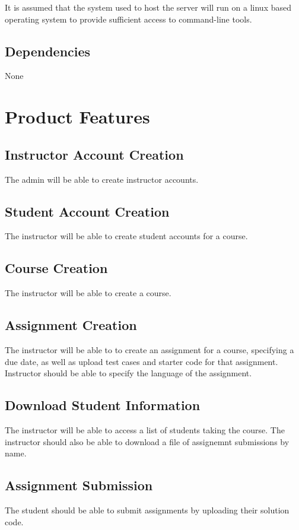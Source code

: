 \documentclass{article}
\begin{document}
It is assumed that the system used to host the server will run on a linux based operating system to provide sufficient access to command-line tools.

\subsection{Dependencies}
None

\section{Product Features}

\subsection{Instructor Account Creation}
The admin will be able to create instructor accounts.

\subsection{Student Account Creation}
The instructor will be able to create student accounts for a course.

\subsection{Course Creation}
The instructor will be able to create a course.

\subsection{Assignment Creation}
The instructor will be able to to create an assignment for a course, specifying a due date, as well as upload test cases and starter code for that assignment. Instructor should be able to specify the language of the assignment.

\subsection{Download Student Information}
The instructor will be able to access a list of students taking the course. The instructor should also be able to download a file of assignemnt submissions by name.

\subsection{Assignment Submission}
The student should be able to submit assignments by uploading their solution code.
\end{document}
